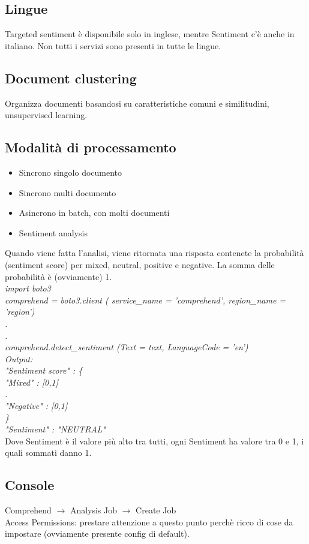 \documentclass{classes/base}
\begin{document}
    \subsection*{Lingue}
    Targeted sentiment è disponibile solo in inglese, mentre Sentiment c'è anche in italiano. 
    Non tutti i servizi sono presenti in tutte le lingue.

    \subsection*{Document clustering}
    Organizza documenti basandosi su caratteristiche comuni e similitudini, unsupervised learning.

    \subsection*{Modalità di processamento}
    \begin{itemize}
        \item Sincrono singolo documento
        \item Sincrono multi documento
        \item Asincrono in batch, con molti documenti
        \item Sentiment analysis
    \end{itemize}
    Quando viene fatta l’analisi, viene ritornata una risposta contenete la probabilità (sentiment score) per mixed, neutral, positive e negative. 
    La somma delle probabilità è (ovviamente) 1. \\
    \textit{import boto3 \\
    comprehend = boto3.client ( service\_name = 'comprehend', region\_name = 'region') \\
    . \\
    . \\
    comprehend.detect\_sentiment (Text = text, LanguageCode = 'en') \\
    Output: \\
    "Sentiment score" : \{ \\
                "Mixed" : [0,1] \\
                . \\      
                "Negative" : [0,1] \\
                \} \\
    "Sentiment" : "NEUTRAL" } \\
    Dove Sentiment è il valore più alto tra tutti, ogni Sentiment ha valore tra 0 e 1, i quali sommati danno 1.\\
    
    \subsection*{Console}
    Comprehend $\rightarrow$ Analysis Job $\rightarrow$ Create Job \\
    Access Permissions: prestare attenzione a questo punto perchè ricco di cose da impostare (ovviamente presente config di default).
\end{document}
